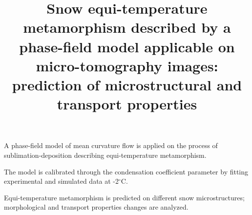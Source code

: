 \documentclass[draft,ms]{agujournal2019}
\begin{document}
\title{Snow equi-temperature metamorphism described by a phase-field model applicable on micro-tomography images: prediction of microstructural and transport properties}





\begin{keypoints}
\item A phase-field model of mean curvature flow is applied on the process of sublimation-deposition describing equi-temperature metamorphism.
\item The model is calibrated through the condensation coefficient parameter by fitting experimental and simulated data at -2$^\circ$C.
\item Equi-temperature metamorphism is predicted on different snow microstructures; morphological and transport properties changes are analyzed.
\end{keypoints}
\end{document}
